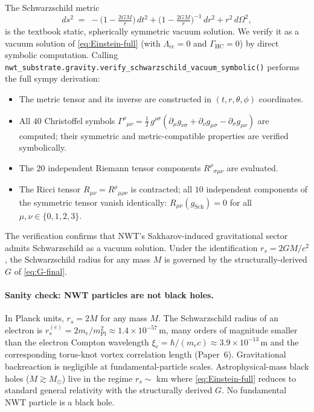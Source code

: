 \documentclass[11pt]{article}
\newcommand{\mPl}{m_{\mathrm{Pl}}}
\newcommand{\me}{m_e}
\begin{document}
The Schwarzschild metric
\begin{equation}
  ds^2
   \;=\;
   -\bigl(1 - \tfrac{2GM}{r}\bigr)\,dt^2
   + \bigl(1 - \tfrac{2GM}{r}\bigr)^{-1}\,dr^2
   + r^2\,d\Omega^2,
  \label{eq:Schwarzschild}
\end{equation}
is the textbook static, spherically symmetric vacuum solution.  We
verify it as a vacuum solution of \eqref{eq:Einstein-full} (with
$\Lambda_{\mathrm{cc}} = 0$ and $\Gamma_{\mathrm{HC}} = 0$) by
direct symbolic computation.  Calling
\texttt{nwt\_substrate.gravity.}\allowbreak\texttt{verify\_\allowbreak schwarzschild\_\allowbreak vacuum\_\allowbreak symbolic()}
performs the full sympy derivation:
\begin{itemize}
\item The metric tensor and its inverse are constructed in
      $(t, r, \theta, \phi)$ coordinates.
\item All $40$ Christoffel symbols
      $\Gamma^{\rho}{}_{\mu\nu} = \tfrac{1}{2}\,g^{\rho\sigma}
      (\partial_\mu g_{\nu\sigma} + \partial_\nu g_{\mu\sigma}
      - \partial_\sigma g_{\mu\nu})$ are computed; their
      symmetric and metric-compatible properties are verified
      symbolically.
\item The $20$ independent Riemann tensor components
      $R^{\rho}{}_{\sigma\mu\nu}$ are evaluated.
\item The Ricci tensor $R_{\mu\nu} = R^\rho{}_{\mu\rho\nu}$ is
      contracted; all $10$ independent components of the symmetric
      tensor vanish identically:
      $R_{\mu\nu}(g_{\mathrm{Sch}}) = 0$ for all
      $\mu, \nu \in \{0, 1, 2, 3\}$.
\end{itemize}
The verification confirms that NWT's Sakharov-induced gravitational
sector admits Schwarzschild as a vacuum solution.  Under the
identification $r_s = 2 G M / c^2$, the Schwarzschild radius for
any mass $M$ is governed by the structurally-derived $G$ of
\eqref{eq:G-final}.

\paragraph{Sanity check: NWT particles are not black holes.}  In
Planck units, $r_s = 2 M$ for any mass $M$.  The Schwarzschild
radius of an electron is
$r_s^{(e)} = 2\me / \mPl^2 \approx 1.4 \times 10^{-57}\,\mathrm{m}$,
many orders of magnitude smaller than the electron Compton
wavelength $\xi_e = \hbar/(\me c) \approx 3.9 \times 10^{-13}\,\mathrm{m}$
and the corresponding torus-knot vortex correlation length
(Paper~6).  Gravitational backreaction is negligible at
fundamental-particle scales.  Astrophysical-mass black holes
($M \gtrsim M_\odot$) live in the regime $r_s \sim$ km where
\eqref{eq:Einstein-full} reduces to standard general relativity
with the structurally derived $G$.  No fundamental NWT particle
is a black hole.
\end{document}
